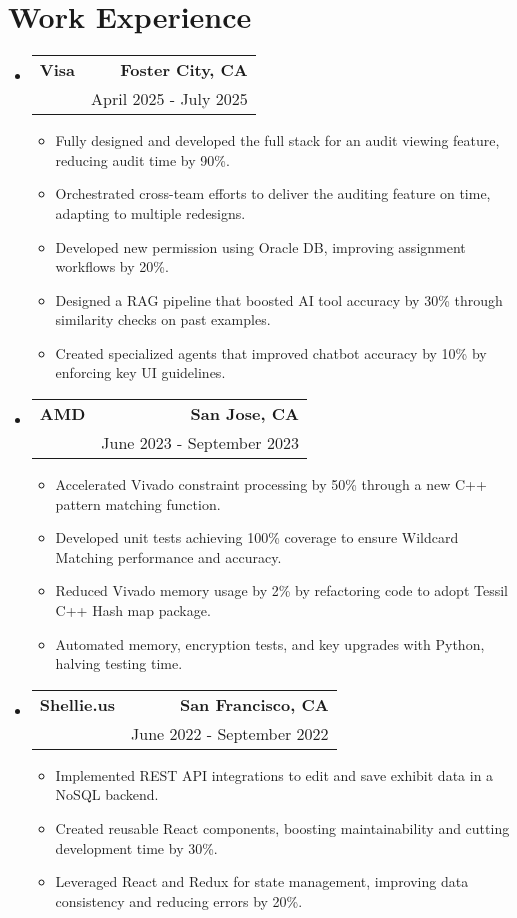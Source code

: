 \documentclass[letterpaper,11pt]{article}
\makeatletter
\newcommand{\resumeItem}[1]{
  \item\small{
    {#1 \vspace{-2pt}}
  }
}
\newcommand{\resumeSubheading}[4]{
  \vspace{-2pt}\item
    \begin{tabular*}{0.97\textwidth}[t]{l@{\extracolsep{\fill}}r}
      \textbf{#1} & #2 \\
      \text{#3} & #4 \\
    \end{tabular*}\vspace{-7pt}
}
\newcommand{\resumeSubHeadingListStart}{\begin{itemize}[leftmargin=0.15in, label={}]}
\newcommand{\resumeSubHeadingListEnd}{\end{itemize}}
\newcommand{\resumeItemListStart}{\begin{itemize}}
\newcommand{\resumeItemListEnd}{\end{itemize}\vspace{-5pt}}
\makeatother
\begin{document}
\section{\textbf{Work Experience}}
  \resumeSubHeadingListStart
    \resumeSubheading
    {Visa}{\textbf{Foster City, CA}}
    {Software Engineer, Java, Typescript}{April 2025 - July 2025}
    \resumeItemListStart
        \resumeItem{Fully designed and developed the full stack for an audit viewing feature, reducing audit time by 90\%.}
        \resumeItem{Orchestrated cross-team efforts to deliver the auditing feature on time, adapting to multiple redesigns.}
        \resumeItem{Developed new permission using Oracle DB, improving assignment workflows by 20\%.}
        \resumeItem{Designed a RAG pipeline that boosted AI tool accuracy by 30\% through similarity checks on past examples.}
        \resumeItem{Created specialized agents that improved chatbot accuracy by 10\% by enforcing key UI guidelines.}
    \resumeItemListEnd
    \resumeSubheading
    {AMD}{\textbf{San Jose, CA}}
    {Software Engineer Intern, C++, Python}{June 2023 - September 2023}
    \resumeItemListStart
        \resumeItem{Accelerated Vivado constraint processing by 50\% through a new C++ pattern matching function.}
        \resumeItem{Developed unit tests achieving 100\% coverage to ensure Wildcard Matching performance and accuracy.}
        \resumeItem{Reduced Vivado memory usage by 2\% by refactoring code to adopt Tessil C++ Hash map package.}
        \resumeItem{Automated memory, encryption tests, and key upgrades with Python, halving testing time.}
    \resumeItemListEnd
    \resumeSubheading
    {Shellie.us}{\textbf{San Francisco, CA}}
    {Software Engineer Intern, React, JavaScript}{June 2022 - September 2022}
    \resumeItemListStart
        \resumeItem{Implemented REST API integrations to edit and save exhibit data in a NoSQL backend.}
        \resumeItem{Created reusable React components, boosting maintainability and cutting development time by 30\%.}
        \resumeItem{Leveraged React and Redux for state management, improving data consistency and reducing errors by 20\%.}
    \resumeItemListEnd
  \resumeSubHeadingListEnd


\end{document}
